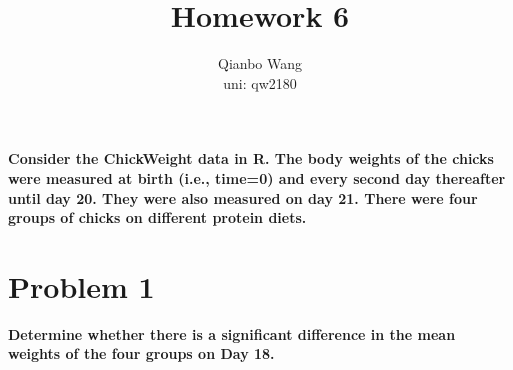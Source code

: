 \documentclass[10pt,letterpaper]{article}
\title{\textbf {Homework 6}}
\author{{Qianbo Wang}\\{uni: qw2180}}
\date{}
\begin{document}
\maketitle
\thispagestyle{fancy}
\vspace{-2em}

{\large{\textbf{Consider the ChickWeight data in R. The body weights of the chicks were measured at birth (i.e., time=0) and every second day thereafter until day 20. They were also measured on day 21. There were four groups of chicks on different protein diets.}}}

\section*{Problem 1}
\textbf{Determine whether there is a significant difference in the mean weights of the four groups on Day 18.}
\end{document}
